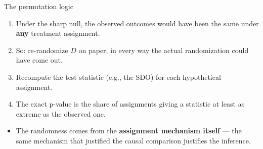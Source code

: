 \documentclass[
  11pt,
  ignorenonframetext,
  aspectratio=169,
]{beamer}
\providecommand{\tightlist}{%
  \setlength{\itemsep}{0pt}\setlength{\parskip}{0pt}}
\begin{document}
\begin{frame}{The permutation logic}
\protect{}\label{the-permutation-logic}
\begin{enumerate}
\tightlist
\item
  Under the sharp null, the observed outcomes would have been the same
  under \textbf{any} treatment assignment.
\item
  So: re-randomize \(D\) on paper, in every way the actual randomization
  could have come out.
\item
  Recompute the test statistic (e.g., the SDO) for each hypothetical
  assignment.
\item
  The exact p-value is the share of assignments giving a statistic at
  least as extreme as the observed one.
\end{enumerate}

\begin{itemize}
\tightlist
\item
  The randomness comes from the \textbf{assignment mechanism itself} ---
  the same mechanism that justified the causal comparison justifies the
  inference.
\end{itemize}
\end{frame}
\end{document}
